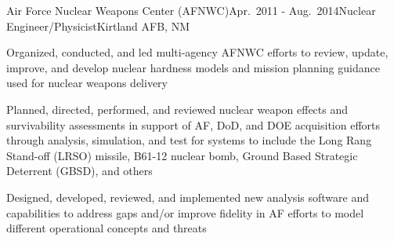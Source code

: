 \begin{rSubsection}{Air Force Nuclear Weapons Center (AFNWC)}{Apr.\ 2011 - Aug.\ 2014}{Nuclear Engineer/Physicist}{Kirtland AFB, NM}
\item Organized, conducted, and led multi-agency AFNWC efforts to review, update, improve, and develop nuclear hardness models and mission planning guidance used for nuclear weapons delivery
\item Planned, directed, performed, and reviewed nuclear weapon effects and survivability assessments in support of AF, DoD, and DOE acquisition efforts through analysis, simulation, and test for systems to include the Long Rang Stand-off (LRSO) missile, B61-12 nuclear bomb, Ground Based Strategic Deterrent (GBSD), and others
\item Designed, developed, reviewed, and implemented new analysis software and capabilities to address gaps and/or improve fidelity in AF efforts to model different operational concepts and threats %
\end{rSubsection}

%
%
